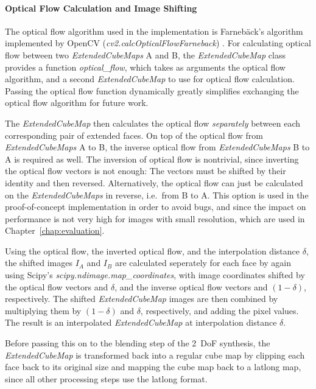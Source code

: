 \paragraph{Optical Flow Calculation and Image Shifting}
The optical flow algorithm used in the implementation is Farneb\"ack's algorithm implemented by OpenCV (\emph{cv2.calcOpticalFlowFarneback}) \cite{opencv}. For calculating optical flow between two \emph{ExtendedCubeMaps} A and B, the \emph{ExtendedCubeMap} class provides a function \emph{optical\_flow}, which takes as arguments the optical flow algorithm, and a second \emph{ExtendedCubeMap} to use for optical flow calculation. Passing the optical flow function dynamically greatly simplifies exchanging the optical flow algorithm for future work.

The \emph{ExtendedCubeMap} then calculates the optical flow \emph{separately} between each corresponding pair of extended faces. On top of the optical flow from \emph{ExtendedCubeMaps} A to B, the inverse optical flow from \emph{ExtendedCubeMaps} B to A is required as well. The inversion of optical flow is nontrivial, since inverting the optical flow vectors is not enough: The vectors must be shifted by their identity and then reversed. Alternatively, the optical flow can just be calculated on the \emph{ExtendedCubeMaps} in reverse, i.e.\ from B to A. This option is used in the proof-of-concept implementation in order to avoid bugs, and since the impact on performance is not very high for images with small resolution, which are used in Chapter~\ref{chap:evaluation}.

Using the optical flow, the inverted optical flow, and the interpolation distance $\delta$, the shifted images $I_A$ and $I_B$ are calculated seperately for each face by again using Scipy's \emph{scipy.ndimage.map\_coordinates}, with image coordinates shifted by the optical flow vectors and $\delta$, and the inverse optical flow vectors and $(1-\delta)$, respectively. The shifted \emph{ExtendedCubeMap} images are then combined by multiplying them by $(1-\delta)$ and $\delta$, respectively, and adding the pixel values. The result is an interpolated \emph{ExtendedCubeMap} at interpolation distance $\delta$.

Before passing this on to the blending step of the 2~DoF synthesis, the \emph{ExtendedCubeMap} is transformed back into a regular cube map by clipping each face back to its original size and mapping the cube map back to a latlong map, since all other processing steps use the latlong format.

